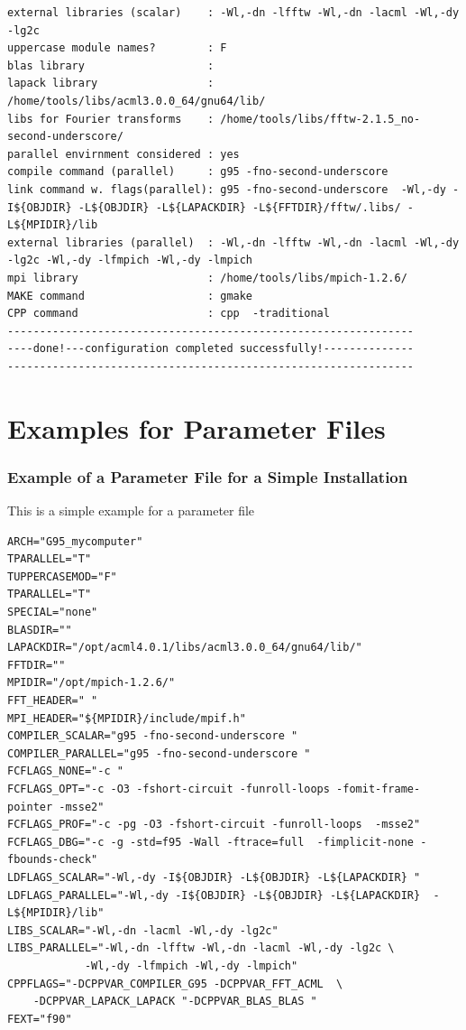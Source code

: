 \documentclass[a4paper,10pt]{report}
\begin{document}
\begin{verbatim}
external libraries (scalar)    : -Wl,-dn -lfftw -Wl,-dn -lacml -Wl,-dy -lg2c
uppercase module names?        : F
blas library                   :
lapack library                 : /home/tools/libs/acml3.0.0_64/gnu64/lib/
libs for Fourier transforms    : /home/tools/libs/fftw-2.1.5_no-second-underscore/
parallel envirnment considered : yes
compile command (parallel)     : g95 -fno-second-underscore
link command w. flags(parallel): g95 -fno-second-underscore  -Wl,-dy -I${OBJDIR} -L${OBJDIR} -L${LAPACKDIR} -L${FFTDIR}/fftw/.libs/ -L${MPIDIR}/lib
external libraries (parallel)  : -Wl,-dn -lfftw -Wl,-dn -lacml -Wl,-dy -lg2c -Wl,-dy -lfmpich -Wl,-dy -lmpich
mpi library                    : /home/tools/libs/mpich-1.2.6/
MAKE command                   : gmake
CPP command                    : cpp  -traditional
---------------------------------------------------------------
----done!---configuration completed successfully!--------------
---------------------------------------------------------------
\end{verbatim}
%
\newpage
\chapter{Examples for Parameter Files}
\label{sec:parmfiles}

\subsection{Example of a Parameter File for a Simple Installation}
\label{sec:parmfilesimple}
This is a simple example for a parameter file
\begin{verbatim}
ARCH="G95_mycomputer"
TPARALLEL="T"
TUPPERCASEMOD="F"
TPARALLEL="T"
SPECIAL="none"
BLASDIR=""
LAPACKDIR="/opt/acml4.0.1/libs/acml3.0.0_64/gnu64/lib/"
FFTDIR=""     
MPIDIR="/opt/mpich-1.2.6/"
FFT_HEADER=" "   
MPI_HEADER="${MPIDIR}/include/mpif.h"
COMPILER_SCALAR="g95 -fno-second-underscore "
COMPILER_PARALLEL="g95 -fno-second-underscore "
FCFLAGS_NONE="-c "
FCFLAGS_OPT="-c -O3 -fshort-circuit -funroll-loops -fomit-frame-pointer -msse2"
FCFLAGS_PROF="-c -pg -O3 -fshort-circuit -funroll-loops  -msse2"
FCFLAGS_DBG="-c -g -std=f95 -Wall -ftrace=full  -fimplicit-none -fbounds-check"
LDFLAGS_SCALAR="-Wl,-dy -I${OBJDIR} -L${OBJDIR} -L${LAPACKDIR} "
LDFLAGS_PARALLEL="-Wl,-dy -I${OBJDIR} -L${OBJDIR} -L${LAPACKDIR}  -L${MPIDIR}/lib"
LIBS_SCALAR="-Wl,-dn -lacml -Wl,-dy -lg2c"
LIBS_PARALLEL="-Wl,-dn -lfftw -Wl,-dn -lacml -Wl,-dy -lg2c \
            -Wl,-dy -lfmpich -Wl,-dy -lmpich"
CPPFLAGS="-DCPPVAR_COMPILER_G95 -DCPPVAR_FFT_ACML  \
    -DCPPVAR_LAPACK_LAPACK "-DCPPVAR_BLAS_BLAS "
FEXT="f90"
\end{verbatim}
\end{document}
